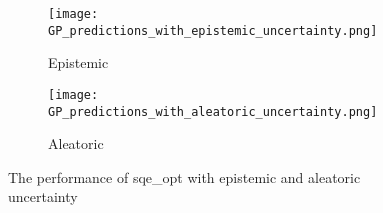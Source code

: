 \begin{figure}[pht]
    \centering
    \begin{subfigure}{0.45\textwidth}
        \centering
        \texttt{[image: GP\_predictions\_with\_epistemic\_uncertainty.png]}
        \caption{Epistemic}
        \label{fig:epistemic}
    \end{subfigure}
    \begin{subfigure}{0.45\textwidth}
        \centering
        \texttt{[image: GP\_predictions\_with\_aleatoric\_uncertainty.png]}
        \caption{Aleatoric}
        \label{fig:aleatoric}
    \end{subfigure}
    \caption{The performance of sqe\_opt with epistemic and aleatoric uncertainty}
    \label{fig:uncertainty}
\end{figure}
